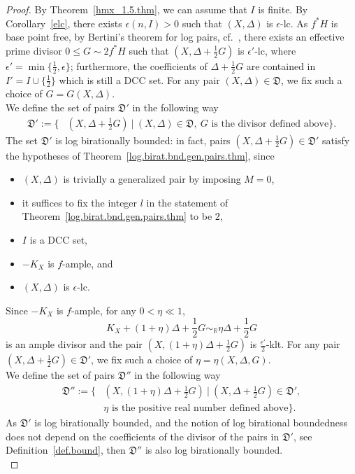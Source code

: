 \documentclass{amsart}[12pt,a4paper]
\theoremstyle{definition}
\begin{document}
\begin{proof}
By Theorem~\ref{hmx_1.5.thm}, we can assume that $I$ is finite.
By Corollary~\ref{elc}, there exists $\epsilon(n, I) >0$ such that $(X, \Delta)$ is $\epsilon$-lc.
As $f^* H$ is base point free,  by Bertini's theorem for log pairs, cf.~\cite[Theorem~4.8]{Kol97}, there exists an effective prime divisor $0 \leq G\sim 2f^* H$ such that $(X,\Delta+\frac 1 2 G)$ is $\epsilon'$-lc, where $\epsilon'=\min\{\frac 1 2, \epsilon\}$; 
furthermore, the coefficients of $\Delta+\frac 1 2 G$ are contained in $I'=I \cup \{\frac 1 2\}$ which is still a DCC set.
For any pair $(X, \Delta) \in \mathfrak{D}$, we fix such a choice of $G=G(X, \Delta)$.
\\
We define the set of pairs $\mathfrak{D}'$ in the following way
\begin{align*}
\mathfrak{D'}:=\{ & (X, \Delta+\frac 1 2 G) \ \vert \ (X, \Delta) \in \mathfrak{D}, \ G \textrm{ is the divisor defined above}\}.
\end{align*}
The set $\mathfrak{D}'$ is log birationally bounded: 
in fact, pairs $(X, \Delta+\frac 1 2 G) \in \mathfrak{D}'$ satisfy the hypotheses of Theorem~\ref{log.birat.bnd.gen.pairs.thm}, since 
\begin{itemize}
\item 
$(X,\Delta)$ is trivially a generalized pair by imposing $M=0$,
\item 
it suffices to fix the integer $l$ in the statement of Theorem~\ref{log.birat.bnd.gen.pairs.thm} to be $2$,
\item 
$I$ is a DCC set, 
\item 
$-K_X$ is $f$-ample, and 
\item 
$(X, \Delta)$ is $\epsilon$-lc.
\end{itemize}	
\noindent
Since $-K_X$ is $f$-ample, for any $0<\eta \ll 1$,
\[
K_X + (1+\eta) \Delta+\frac 1 2 G \sim_\mathbb{R} \eta \Delta + \frac 1 2 G
\] 
is an ample divisor and the pair $(X, (1+\eta) \Delta+\frac 1 2 G)$ is $\frac{\epsilon'}{2}$-klt.
For any pair $(X, \Delta+ \frac 1 2 G) \in \mathfrak{D}'$, we fix such a choice of $\eta=\eta(X, \Delta, G)$.
\\
We define the set of pairs $\mathfrak{D}''$ in the following way
\begin{align*}
\mathfrak{D}'':=\{ & (X, (1+\eta)\Delta+\frac 1 2 G) \ \vert \ (X, \Delta+\frac 1 2 G) \in \mathfrak{D}', \\ 
& \eta \textrm{ is the positive real number defined above}\}.
\end{align*}
As $\mathfrak{D}'$ is log birationally bounded,  and the notion of log birational boundedness does not depend on the coefficients of the divisor of the pairs in $\mathfrak{D}'$, see Definition~\ref{def.bound}, then $\mathfrak{D}''$ is also log birationally bounded.\\


\end{proof}
\end{document}
